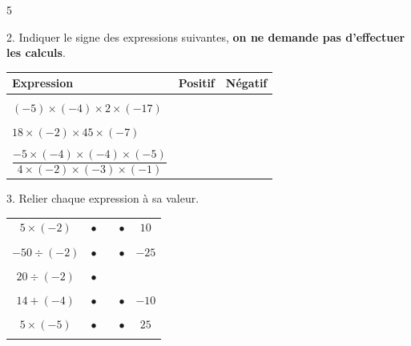 \documentclass[a4paper]{book}
\begin{document}
{\begin{exerciceNote}{5}
\begin{enumerate}[leftmargin=*]
            \bigskip


            \begin{minipage}[b]{0.45\linewidth}
                2. Indiquer le signe des expressions suivantes, \textbf{on ne demande pas d'effectuer les calculs}.

                \medskip
    
                \begin{tabular}{|l|c|c|}
                    \hline
                    Expression & Positif & Négatif\\[2ex] 
                    \hline & & \\
                    $(-5)\times(-4)\times2\times(-17)$ & &  \\[2ex] 
                    \hline & &\\
                    $18\times(-2)\times45\times(-7)$ & & \\[2ex]
                    \hline & &\\
                    $\dfrac{-5\times(-4)\times(-4)\times(-5)}{4\times(-2)\times(-3)\times(-1)}$ & & \\[2ex]
                    \hline
                \end{tabular}
            \end{minipage}
            \hfill \vline\hfill
            \begin{minipage}{0.45\linewidth}
                3. Relier chaque expression à sa valeur.

                \bigskip

                \begin{tabular}{ccp{1cm}cc}
                    $5\times(-2)$   & $\bullet$   & & $\bullet$ & $10$ \\ \\

                    $-50\div(-2)$   & $\bullet$   & & $\bullet$ & $-25$ \\ \\

                    $20\div(-2)$    & $\bullet$   & &  \\ \\

                    $14+(-4)$       & $\bullet$   & & $\bullet$ & $-10$  \\ \\

                    $5\times(-5)$   & $\bullet$   & & $\bullet$ & $25$ \\ \\
                \end{tabular}


\end{minipage}
\end{enumerate}
\end{exerciceNote}}
\end{document}
